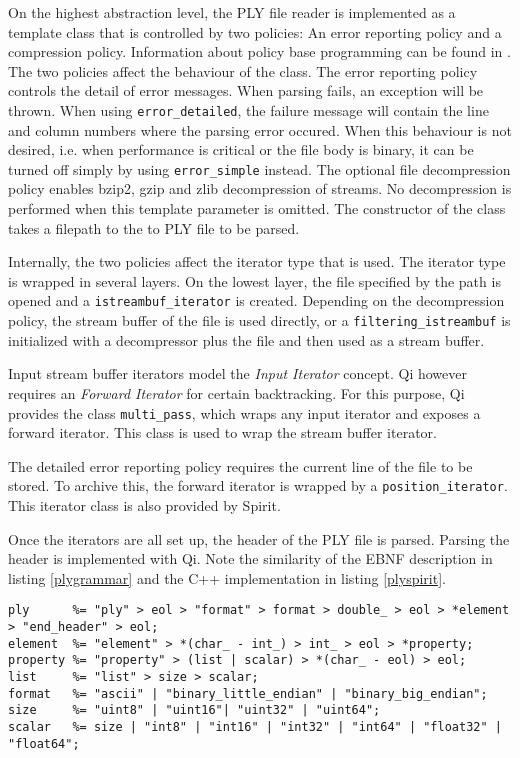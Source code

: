 On the highest abstraction level, the PLY file reader is implemented as a
template class that is controlled by two policies: An error reporting policy and
a compression policy. Information about policy base programming can be found in
\cite{Alexandrescu:2001:MCD:377789}. The two policies affect the behaviour of
the class. The error reporting policy controls the detail of error messages.
When parsing fails, an exception will be thrown. When using
\texttt{error\_detailed}, the failure message will contain the line and column
numbers where the parsing error occured. When this behaviour is not desired,
i.e. when performance is critical or the file body is binary, it can be turned
off simply by using \texttt{error\_simple} instead. The optional file
decompression policy enables bzip2, gzip and zlib decompression of streams.
No decompression is performed when this template parameter is omitted.
The constructor of the class takes a filepath to the to PLY file to be parsed.

Internally, the two policies affect the iterator type that is used. The iterator
type is wrapped in several layers. On the lowest layer, the file specified by
the path is opened and a \texttt{istreambuf\_iterator} is created. Depending on
the decompression policy, the stream buffer of the file is used directly, or a
\texttt{filtering\_istreambuf} is initialized with a decompressor plus the file
and then used as a stream buffer.

Input stream buffer iterators model the \emph{Input Iterator} concept. Qi
however requires an \emph{Forward Iterator} for certain backtracking. For this
purpose, Qi provides the class \texttt{multi\_pass}, which wraps any input
iterator and exposes a forward iterator. This class is used to wrap the stream
buffer iterator.

The detailed error reporting policy requires the current line of the file to be
stored. To archive this, the forward iterator is wrapped by a
\texttt{position\_iterator}. This iterator class is also provided by Spirit.


Once the iterators are all set up, the header of the PLY file is parsed. Parsing
the header is implemented with Qi. Note the similarity of the EBNF description
in listing \ref{plygrammar} and the C++ implementation in listing
\ref{plyspirit}.

\begin{lstlisting}[label=plyspirit, float=*,frame=tb,caption=C++ Grammar of the PLY file header]
ply      %= "ply" > eol > "format" > format > double_ > eol > *element > "end_header" > eol;
element  %= "element" > *(char_ - int_) > int_ > eol > *property;
property %= "property" > (list | scalar) > *(char_ - eol) > eol;
list     %= "list" > size > scalar;
format   %= "ascii" | "binary_little_endian" | "binary_big_endian";
size     %= "uint8" | "uint16"| "uint32" | "uint64";
scalar   %= size | "int8" | "int16" | "int32" | "int64" | "float32" | "float64";
\end{lstlisting}

